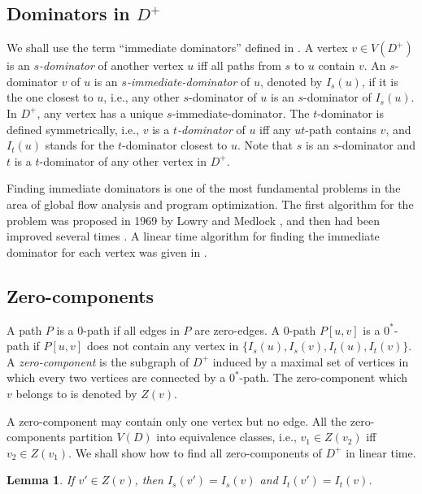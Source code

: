 \documentclass[review]{elsarticle}
\def\squarebox#1{\hbox to #1{\hfill\vbox to #1{\vfill}}}
\renewcommand{\qed}{\hspace*{\fill}
            \vbox{\hrule\hbox{\vrule\squarebox{.667em}\vrule}\hrule}\smallskip\newline}
\newtheorem{lem}[thm]{Lemma}
\begin{document}
\subsection{Dominators in $D^+$}

We shall use the term ``immediate dominators'' defined in
\cite{als99}. A vertex $v\in V(D^+)$ is an {\em $s$-dominator} of
another vertex $u$ iff all paths from $s$ to $u$ contain $v$. An
$s$-dominator $v$ of $u$ is an \emph{$s$-immediate-dominator} of
$u$, denoted by $I_s(u)$, if it is the one closest to $u$, i.e., any
other $s$-dominator of $u$ is an $s$-dominator of $I_s(u)$. In
$D^+$, any vertex has a unique $s$-immediate-dominator. The
$t$-dominator is defined symmetrically, i.e., $v$ is a {\em
$t$-dominator} of $u$ iff any $ut$-path contains $v$, and $I_t(u)$
stands for the $t$-dominator closest to $u$. Note that $s$ is an
$s$-dominator and $t$ is a $t$-dominator of any other vertex in
$D^+$.

Finding immediate dominators is one of the most fundamental problems
in the area of global flow analysis and program optimization. The
first algorithm for the problem was proposed in 1969 by Lowry and
Medlock \cite{lor69}, and then had been improved several times
\cite{har85,len79,pur72,tar74}. A linear time algorithm for finding
the immediate dominator for each vertex was given in \cite{als99}.

\subsection{Zero-components}
\mbox{}

\begin{defi} A path $P$ is a 0-path if all
edges in $P$ are zero-edges. A 0-path $P[u,v]$ is a
$0^*$-path if $P[u,v]$ does not contain any vertex in
$\{I_s(u),I_s(v),I_t(u),I_t(v)\}$. A {\em zero-component} is the subgraph
of $D^+$ induced by a maximal set of vertices in which every two
vertices are connected by a $0^*$-path. The zero-component which $v$
belongs to is denoted by $Z(v)$.
\end{defi}

A zero-component may contain only one vertex but no edge. All the
zero-components partition $V(D)$ into equivalence classes, i.e.,
$v_1\in Z(v_2)$ iff $v_2\in Z(v_1)$. We shall show how to find all
zero-components of $D^+$ in linear time.

\begin{lem}\label{zero-d}
If $v'\in Z(v)$, then $I_s(v')=I_s(v)$ and $I_t(v')=I_t(v)$.
\end{lem}
\end{document}
